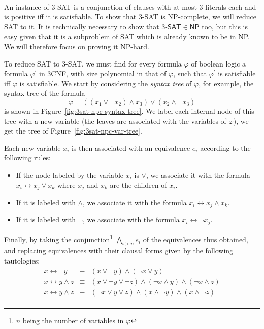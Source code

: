 \begin{example}\ \\
    \label{ex:3sat-npc}
    An instance of 3-\textsf{SAT} is a conjunction of clauses with at most 3 literals each and is positive iff it is satisfiable. To show that 3-\textsf{SAT} is \textsf{NP}-complete, we will reduce \textsf{SAT} to it. It is technically necessary to show that \(3\textsf{-SAT}\in\textsf{NP}\) too, but this is easy given that it is a subproblem of \textsf{SAT} which is already known to be in \textsf{NP}. We will therefore focus on proving it \textsf{NP}-hard.

    To reduce \textsf{SAT} to 3-\textsf{SAT}, we must find for every formula \(\varphi\) of boolean logic a formula \(\varphi^\prime\) in 3CNF, with size polynomial in that of \(\varphi\), such that \(\varphi^\prime\) is satisfiable iff \(\varphi\) is satisfiable. We start by considering the \emph{syntax tree} of \(\varphi\), for example, the syntax tree of the formula 
    \[\varphi = \left((x_1 \vee \neg x_2) \wedge x_3\right) \vee (x_2 \wedge \neg x_3)\] 
    is shown in Figure~\ref{fig:3sat-npc-syntax-tree}. We label each internal node of this tree with a new variable (the leaves are associated with the variables of \(\varphi\)), we get the tree of Figure~\ref{fig:3sat-npc-var-tree}.

    Each new variable \(x_i\) is then associated with an equivalence \(e_i\) according to the following rules:
    \begin{itemize}
        \item If the node labeled by the variable \(x_i\) is \(\vee\), we associate it with the formula \(x_i \leftrightarrow x_j \vee x_k\) where \(x_j\) and \(x_k\) are the children of \(x_i\).
        \item If it is labeled with \(\wedge\), we associate it with the formula \(x_i \leftrightarrow x_j \wedge x_k\).
        \item If it is labeled with \(\neg\), we associate with the formula \(x_i \leftrightarrow \neg x_j\).
    \end{itemize}

    Finally, by taking the conjunction\footnote{\(n\) being the number of variables in \(\varphi\)} 
    \(\bigwedge\limits_{i>n}e_i\) of the equivalences thus obtained, and replacing equivalences with their clausal forms given by the following tautologies:
    \[
        \begin{array}{rcl}
            x \leftrightarrow \neg y &\equiv& (x\vee\neg y)\wedge (\neg x \vee y) \\
            x \leftrightarrow y \wedge z &\equiv& (x\vee\neg y\vee\neg z) \wedge 
            (\neg x \wedge y) \wedge (\neg x \wedge z) \\
            x \leftrightarrow y \wedge z &\equiv& (\neg x\vee y\vee z) \wedge 
            (x \wedge\neg y) \wedge (x \wedge\neg z) \\
        \end{array}
    \]


\end{example}
